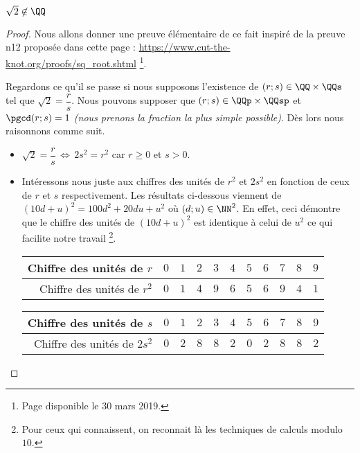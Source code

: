 \begin{fact} \label{sqrt-2-not-in-Q}
	$\sqrt2 \not\in \QQ$
\end{fact}

\begin{proof}
	Nous allons donner une preuve élémentaire de ce fait inspiré de la preuve n\textdegree{}12 proposée dans cette page : \url{https://www.cut-the-knot.org/proofs/sq_root.shtml} 
	\footnote{
		Page disponible le 30 mars 2019.
	}.
	
	\medskip
	
	Regardons ce qu'il se passe si nous supposons l'existence de $(r ; s) \in \QQ \times \QQs$ tel que $\sqrt2 = \dfrac{r}{s}$. Nous pouvons supposer que $(r ; s) \in \QQp \times \QQsp$ et $\pgcd(r ; s) = 1$ \emph{(nous prenons la fraction la plus simple possible)}.
	Dès lors nous raisonnons comme suit.
	
	\begin{itemize}[label=\small\textbullet]
		\item $\sqrt2 = \dfrac{r}{s} \, \Leftrightarrow \, 2 s^2 = r^2$ car $r \geq 0$ et $s > 0$.


		\item Intéressons nous juste aux chiffres des unités de $r^2$ et $2s^2$ en fonction de ceux de $r$ et $s$ respectivement. Les résultats ci-dessous viennent de $(10d + u)^2 = 100d^2 + 20du + u^2$ où $(d ; u) \in \NN^2$.
		En effet, ceci démontre que le chiffre des unités de $(10d + u)^2$ est identique à celui de $u^2$ ce qui facilite notre travail
		\footnote{
			Pour ceux qui connaissent, on reconnait là les techniques de calculs modulo $10$.
		}.
		\begin{center}
			\begin{tabular}{|r|c|c|c|c|c|c|c|c|c|c|}
				\hline
				Chiffre des unités de $r$
				  & $0$  &  $1$  &  $2$  &  $3$  &  $4$  &  $5$  &  $6$  &  $7$  &  $8$  &  $9$
				\\ \hline
				\phantom{$2$}Chiffre des unités de $r^2$
				  & $0$  &  $1$  &  $4$  &  $9$  &  $6$  &  $5$  &  $6$  &  $9$  &  $4$  &  $1$
				\\ \hline
			\end{tabular}

			\medskip
			
			\begin{tabular}{|r|c|c|c|c|c|c|c|c|c|c|}
				\hline
				Chiffre des unités de $s$
				  & $0$  &  $1$  &  $2$  &  $3$  &  $4$  &  $5$  &  $6$  &  $7$  &  $8$  &  $9$
				\\ \hline
				Chiffre des unités de $2s^2$
				  & $0$  &  $2$  &  $8$  &  $8$  &  $2$  &  $0$  &  $2$  &  $8$  &  $8$  &  $2$
				\\ \hline
			\end{tabular}
		\end{center}



\end{itemize}
\end{proof}
